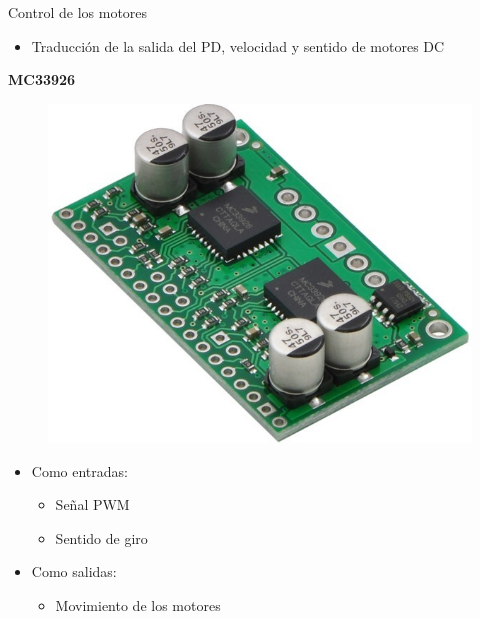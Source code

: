 \documentclass{beamer}
\begin{document}
\begin{frame}{Control de los motores}
\begin{block}{}
	\begin{itemize}
		\item Traducción de la salida del PD, velocidad y sentido de motores DC \pause
	\end{itemize}
\end{block}
\centering \textbf{MC33926}
		\begin{figure}[H]
			\center
			\includegraphics[trim = 0mm 0cm 0mm 0cm, clip,scale=0.2]{imagenes/Balancing_robot/driver_motor.jpg} \pause
		\end{figure}

\begin{alertblock}{}
	\begin{itemize}
		\item Como entradas: \begin{itemize}
			\item Señal PWM \pause
			\item Sentido de giro \pause
		\end{itemize}
		\item Como salidas: \begin{itemize}
		\item Movimiento de los motores 
	\end{itemize}
	\end{itemize}
\end{alertblock}
\end{frame}
\end{document}
